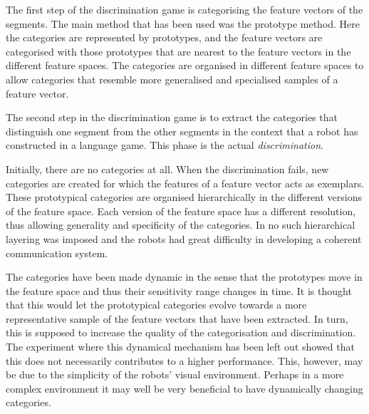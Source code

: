 The first step of the discrimination game is categorising the feature vectors of the segments. The main method that has been used was the prototype method. Here the categories are represented by prototypes, and the feature vectors are categorised with those prototypes that are nearest to the feature vectors in the different feature spaces. The categories are organised in different feature spaces to allow categories that resemble more generalised and specialised samples of a feature vector.

The second step in the discrimination game is to extract the categories that distinguish one segment from the other segments in the context that a robot has constructed in a language game. This phase is the actual {\em discrimination}.

Initially, there are no categories at all. When the discrimination fails, new categories are created for which the features of a feature vector acts as exemplars. These prototypical categories are organised hierarchically in the different versions of the feature space. Each version of the feature space has a different resolution, thus allowing generality and specificity of the categories. In \citealt{dejongvogt:1998} no such hierarchical layering was imposed and the robots had great difficulty in developing a coherent communication system. 


The categories have been made dynamic in the sense that the prototypes move in the feature space and thus their sensitivity range changes in time. It is thought that this would let the prototypical categories evolve towards a more representative sample of the feature vectors that have been extracted. In turn, this is supposed to increase the quality of the categorisation and discrimination. The experiment where this dynamical mechanism has been left out showed that this does not necessarily contributes to a higher performance. This, however, may be due to the simplicity of the robots' visual environment. Perhaps in a more complex environment it may well be very beneficial to have dynamically changing categories.

